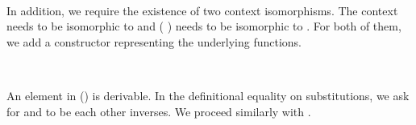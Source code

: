 \begin{AgdaAlign}
\begin{code}%
%
\>[4]\AgdaSpace{}%
\AgdaSymbol{:}\AgdaSpace{}%
\AgdaSymbol{\{}\AgdaSpace{}%
\AgdaSpace{}%
\AgdaSymbol{:}\AgdaSpace{}%
\AgdaSpace{}%
\AgdaSymbol{\}}\AgdaSpace{}%
\AgdaSpace{}%
\AgdaSpace{}%
\AgdaSpace{}%
\AgdaSpace{}%
\AgdaSpace{}%
\AgdaSpace{}%
\AgdaSymbol{(}\AgdaSpace{}%
\AgdaSymbol{)}\AgdaSpace{}%
\AgdaSymbol{(}\AgdaSpace{}%
\AgdaSymbol{)}\<%
\\
%
\>[4]\AgdaSpace{}%
\AgdaSymbol{:}\AgdaSpace{}%
\AgdaSymbol{\{}\AgdaSpace{}%
\AgdaSpace{}%
\AgdaSymbol{:}\AgdaSpace{}%
\AgdaSpace{}%
\AgdaSymbol{\}}\AgdaSpace{}%
\AgdaSpace{}%
\AgdaSpace{}%
\AgdaSymbol{(}\AgdaSpace{}%
\AgdaSymbol{)}\AgdaSpace{}%
\AgdaSymbol{(}\AgdaSpace{}%
\AgdaSymbol{)}\AgdaSpace{}%
\AgdaSpace{}%
\AgdaSpace{}%
\AgdaSpace{}%
\<%
\end{code}

In addition, we require the existence of two context isomorphisms. The context  needs
to be isomorphic to  and  ( \IC{,} )
needs to be isomorphic to   \IC{,} 
. For both of them, we add a constructor representing the underlying functions.

\begin{code}%
%
\>[4]\AgdaSpace{}%
\AgdaSymbol{:}\AgdaSpace{}%
\AgdaSpace{}%
\AgdaSpace{}%
\AgdaSymbol{(}\AgdaSpace{}%
\AgdaSymbol{)}\<%
\\
%
\>[4]\AgdaSpace{}%
\AgdaSymbol{:}\AgdaSpace{}%
\AgdaSymbol{(}\AgdaSpace{}%
\AgdaSymbol{:}\AgdaSpace{}%
\AgdaSpace{}%
\AgdaSymbol{)}\AgdaSpace{}%
\AgdaSymbol{(}\AgdaSpace{}%
\AgdaSymbol{:}\AgdaSpace{}%
\AgdaSpace{}%
\AgdaSymbol{)}\AgdaSpace{}%
\AgdaSpace{}%
\AgdaSpace{}%
\AgdaSymbol{(}\AgdaSpace{}%
\AgdaSpace{}%
\AgdaOperator{\AgdaInductiveConstructor{,}}\AgdaSpace{}%
\AgdaSpace{}%
\AgdaSymbol{)}\AgdaSpace{}%
\AgdaSymbol{(}\AgdaSpace{}%
\AgdaSymbol{(}\AgdaSpace{}%
\AgdaOperator{\AgdaInductiveConstructor{,}}\AgdaSpace{}%
\AgdaSymbol{))}\<%
\end{code}
\end{AgdaAlign}
An element  in 
()  is derivable. In the definitional
equality on substitutions, we ask for  and
 to be each other inverses. We proceed similarly with
.

